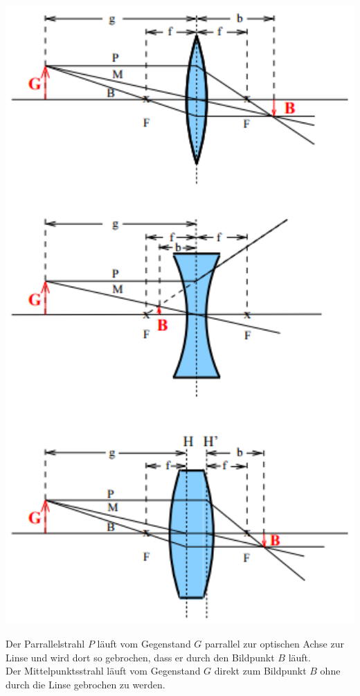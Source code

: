 \begin{minipage}[T]{0.5\textwidth}
\includegraphics[width=1\textwidth]{picture/Bild1.PNG}
\label{fig:Bild1}
\end{minipage}
Der Parrallelstrahl $P$ läuft vom Gegenstand $G$ parrallel zur optischen Achse zur Linse und wird dort so gebrochen, dass er durch den Bildpunkt $B$ läuft. \\
Der Mittelpunktsstrahl läuft vom Gegenstand $G$ direkt zum Bildpunkt $B$ ohne durch die Linse gebrochen zu werden.\\
